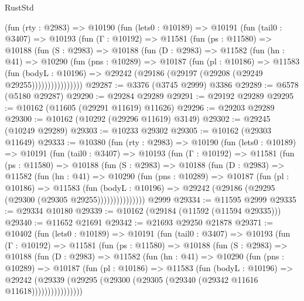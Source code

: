 \begin{lexlean}{RustStd}
\begin{coremodule}
      (fun (rty : @2983) =>
      @10190
        (fun (lets0 : @10189) =>
        @10191
          (fun (tail0 : @3407) =>
          @10193
            (fun (Γ : @10192) =>
            @11581
              (fun (ps : @11580) =>
              @10188
                (fun (S : @2983) =>
                @10188
                  (fun (D : @2983) =>
                  @11582
                    (fun (hn : @41) =>
                    @10290
                      (fun (pns : @10289) =>
                      @10187
                        (fun (pl : @10186) =>
                        @11583
                          (fun (bodyL : @10196) =>
                          @29242 (@29186 (@29197 (@29208 (@29249 @29255))))))))))))))))
@29287 := @3376 (@3745 @2999) @3386
@29289 := @6578 (@5180 @29287)
@29290 := @29284 @29289
@29291 := @29192 @29289
@29295 := @10162 (@11605 (@29291 @11619) @11626)
@29296 := @29203 @29289
@29300 := @10162 (@10292 (@29296 @11619) @3149)
@29302 := @29245 (@10249 @29289)
@29303 := @10233 @29302
@29305 := @10162 (@29303 @11649)
@29333 := @10380
    (fun (rty : @2983) =>
    @10190
      (fun (lets0 : @10189) =>
      @10191
        (fun (tail0 : @3407) =>
        @10193
          (fun (Γ : @10192) =>
          @11581
            (fun (ps : @11580) =>
            @10188
              (fun (S : @2983) =>
              @10188
                (fun (D : @2983) =>
                @11582
                  (fun (hn : @41) =>
                  @10290
                    (fun (pns : @10289) =>
                    @10187
                      (fun (pl : @10186) =>
                      @11583
                        (fun (bodyL : @10196) =>
                        @29242 (@29186 (@29295 (@29300 (@29305 @29255)))))))))))))))
    @2999
@29334 := @11595 @2999
@29335 := @29334 @10180
@29339 := @10162 (@29184 (@11592 (@11594 @29335)))
@29340 := @11652 @21691
@29342 := @21693 @29250 @21878
@29371 := @10402
    (fun (lets0 : @10189) =>
    @10191
      (fun (tail0 : @3407) =>
      @10193
        (fun (Γ : @10192) =>
        @11581
          (fun (ps : @11580) =>
          @10188
            (fun (S : @2983) =>
            @10188
              (fun (D : @2983) =>
              @11582
                (fun (hn : @41) =>
                @10290
                  (fun (pns : @10289) =>
                  @10187
                    (fun (pl : @10186) =>
                    @11583
                      (fun (bodyL : @10196) =>
                      @29242
                        (@29339
                          (@29295 (@29300 (@29305 (@29340 (@29342 @11616 @11618))))))))))))))))

\end{coremodule}
\end{lexlean}
